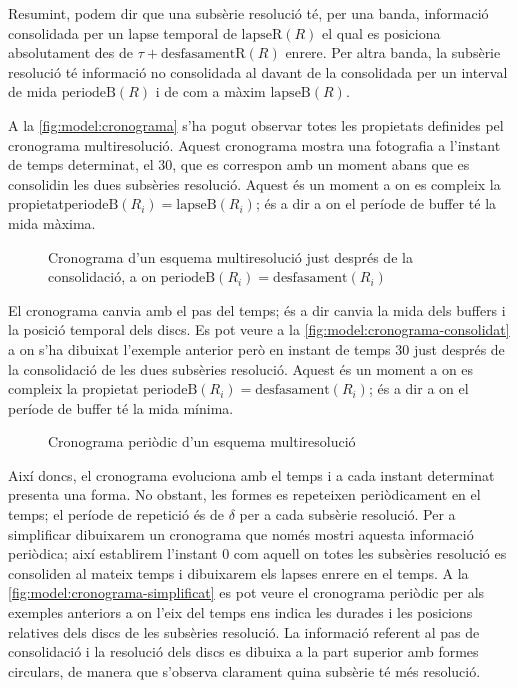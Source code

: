 Resumint, podem dir que una subsèrie resolució té, per una
banda, informació consolidada per un lapse temporal de
$\text{lapseR}(R)$ el qual es posiciona absolutament des de $\tau +
\text{desfasamentR}(R)$ enrere. Per altra banda, la subsèrie resolució
té informació no consolidada al davant de la consolidada per un
interval de mida $\text{periodeB}(R)$ i de com a màxim
$\text{lapseB}(R)$. 

A la \autoref{fig:model:cronograma} s'ha pogut observar totes les
propietats definides pel cronograma multiresolució. Aquest cronograma
mostra una fotografia a l'instant de temps determinat, el $30$, que es
correspon amb un moment abans que es consolidin les dues subsèries
resolució. Aquest és un moment a on es compleix la
propietat$\text{periodeB}(R_i)=\text{lapseB}(R_i)$; és a dir a on el
període de buffer té la mida màxima.

\begin{figure}[tp]
  \centering
  
  \caption{Cronograma d'un esquema multiresolució just després de la consolidació, a on $\text{periodeB}(R_i)=\text{desfasament}(R_i)$}
  \label{fig:model:cronograma-consolidat}
\end{figure}

El cronograma canvia amb el pas del temps; és a dir canvia la mida
dels buffers i la posició temporal dels discs. Es pot veure a la
\autoref{fig:model:cronograma-consolidat} a on s'ha dibuixat l'exemple anterior
però en instant de temps $30$ just després de la consolidació de les
dues subsèries resolució. Aquest és un moment a on es compleix la
propietat $\text{periodeB}(R_i)=\text{desfasament}(R_i)$; és a dir a
on el període de buffer té la mida mínima.  


\begin{figure}[tp]
  \centering
  
  \caption{Cronograma periòdic d'un esquema multiresolució}
  \label{fig:model:cronograma-simplificat}
\end{figure}

Així doncs, el cronograma evoluciona amb el temps i a cada instant
determinat presenta una forma. No obstant, les formes es repeteixen
periòdicament en el temps; el període de repetició és de $\delta$ per
a cada subsèrie resolució. Per a simplificar dibuixarem un cronograma
que només mostri aquesta informació periòdica; així establirem
l'instant 0 com aquell on totes les subsèries resolució es consoliden
al mateix temps i dibuixarem els lapses enrere en el temps. A la
\autoref{fig:model:cronograma-simplificat} es pot veure el cronograma
periòdic per als exemples anteriors a on l'eix del temps ens indica
les durades i les posicions relatives dels discs de les subsèries
resolució. La informació referent al pas de consolidació i la
resolució dels discs es dibuixa a la part superior amb formes
circulars, de manera que s'observa clarament quina subsèrie té més
resolució.







